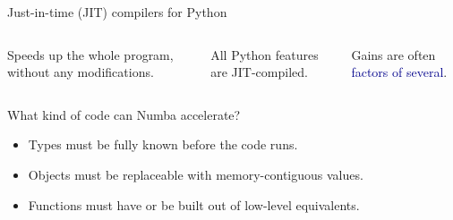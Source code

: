 \documentclass[aspectratio=169]{beamer}
\begin{document}
\begin{frame}{Just-in-time (JIT) compilers for Python}
\begin{columns}
\vspace{0.2 cm}

Speeds up the whole program, without any modifications.

\vspace{0.2 cm}

All Python features are JIT-compiled. \mbox{\hspace{4 cm}}

\vspace{0.2 cm}

Gains are often \textcolor{darkblue}{factors of several}.

\end{columns}
\end{frame}

\begin{frame}{What kind of code can Numba accelerate?}
\Large
\vspace{0.5 cm}

\begin{itemize}
\item Types must be fully known before the code runs.
\item Objects must be replaceable with memory-contiguous values.
\item Functions must have or be built out of low-level equivalents.
\end{itemize}

\vspace{0.5 cm}

\vspace{0.4 cm}

\large

\vspace{0.4 cm}
\end{frame}
\end{document}
